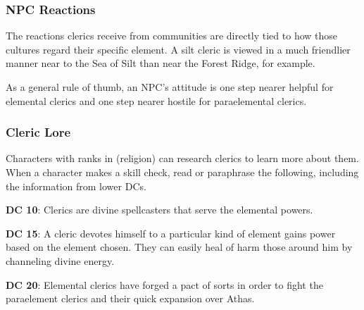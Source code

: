 \subsubsection{NPC Reactions}

The reactions clerics receive from communities are directly tied to how those cultures regard their specific element. A silt cleric is viewed in a much friendlier manner near to the Sea of Silt than near the Forest Ridge, for example.

As a general rule of thumb, an NPC's attitude is one step nearer helpful for elemental clerics and one step nearer hostile for paraelemental clerics.

\subsubsection{Cleric Lore}

Characters with ranks in  (religion) can research clerics to learn more about them. When a character makes a skill check, read or paraphrase the following, including the information from lower DCs.

\textbf{DC 10}: Clerics are divine spellcasters that serve the elemental powers.

\textbf{DC 15}: A cleric devotes himself to a particular kind of element gains power based on the element chosen. They can easily heal of harm those around him by channeling divine energy.

\textbf{DC 20}: Elemental clerics have forged a pact of sorts in order to fight the paraelement clerics and their quick expansion over Athas.

